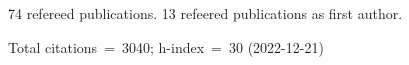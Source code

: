74 refereed publications. 13 refeered publications as first author.

Total citations~=~3040; h-index~=~30 (2022-12-21)